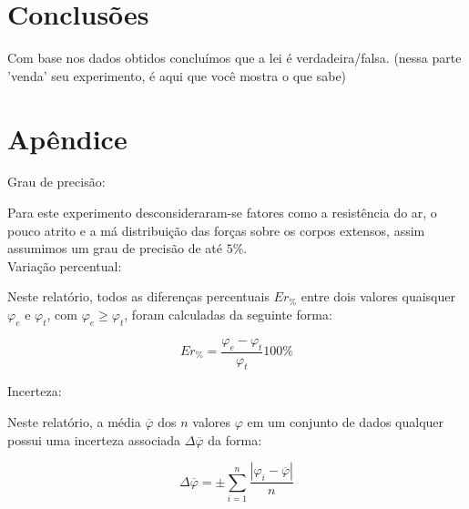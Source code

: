 \documentclass[
   12pt,                         %
   openright,                    %
   oneside,                      %
   a4paper,                      %
   sumario = tradicional,        %
   chapter=TITLE,                %
   section=TITLE,                %
   subsection=TITLE,             %
   subsubsection=TITLE,          %
   english,                      %
   french,                       %
   spanish,                      %
   brazil,                       %
   xcolor=table                  %
]{abntex2}
\begin{document}
      {\let\clearpage\relax 
   \chapter{Conclusões}
      \vspace{0.5cm}}

      Com base nos dados obtidos concluímos que a lei é verdadeira/falsa. (nessa parte 'venda' seu experimento, é aqui que você mostra o que sabe)

   \postextual

   {\let\clearpage\relax 
   \chapter{Apêndice}}

      \noindent Grau de precisão:

      Para este experimento desconsideraram-se fatores como a resistência do ar, o pouco atrito e a má distribuição das forças 
      sobre os corpos extensos, assim assumimos um grau de precisão de até $5\%$. \\

      \noindent Variação percentual:

      Neste relatório, todos as diferenças percentuais $Er_\%$ entre dois valores quaisquer $\varphi_e$ e $\varphi_t$, com 
      $\varphi_e\geq\varphi_t$, foram 
      calculadas da seguinte forma:

      \begin{equation} \label{eq:errper}
         Er_\% = \frac{\varphi_e - \varphi_t}{\varphi_t}100\%
      \end{equation}

      \noindent Incerteza:

      Neste relatório, a média $\overline{\varphi}$ dos $n$ valores $\varphi$ em um conjunto de dados qualquer possui uma 
      incerteza associada $\Delta \overline{\varphi}$ da forma:

      \begin{equation}\label{eq:incet}
         \Delta \overline{\varphi} = ± \sum_{i=1}^{n} \frac{| \varphi_i - \overline{\varphi}|}{n}
      \end{equation}

   
\end{document}
